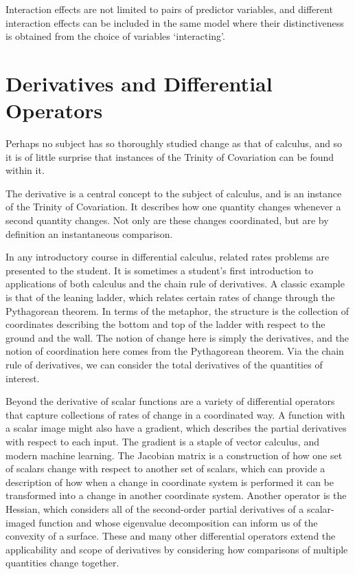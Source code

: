 \documentclass[
  letterpaper,
  DIV=11,
  numbers=noendperiod]{scrreprt}
\begin{document}
Interaction effects are not limited to pairs of predictor variables, and
different interaction effects can be included in the same model where
their distinctiveness is obtained from the choice of variables
`interacting'.

\section{Derivatives and Differential
Operators}\label{derivatives-and-differential-operators}

Perhaps no subject has so thoroughly studied change as that of calculus,
and so it is of little surprise that instances of the Trinity of
Covariation can be found within it.

The derivative is a central concept to the subject of calculus, and is
an instance of the Trinity of Covariation. It describes how one quantity
changes whenever a second quantity changes. Not only are these changes
coordinated, but are by definition an instantaneous comparison.

In any introductory course in differential calculus, related rates
problems are presented to the student. It is sometimes a student's first
introduction to applications of both calculus and the chain rule of
derivatives. A classic example is that of the leaning ladder, which
relates certain rates of change through the Pythagorean theorem. In
terms of the metaphor, the structure is the collection of coordinates
describing the bottom and top of the ladder with respect to the ground
and the wall. The notion of change here is simply the derivatives, and
the notion of coordination here comes from the Pythagorean theorem. Via
the chain rule of derivatives, we can consider the total derivatives of
the quantities of interest.

Beyond the derivative of scalar functions are a variety of differential
operators that capture collections of rates of change in a coordinated
way. A function with a scalar image might also have a gradient, which
describes the partial derivatives with respect to each input. The
gradient is a staple of vector calculus, and modern machine learning.
The Jacobian matrix is a construction of how one set of scalars change
with respect to another set of scalars, which can provide a description
of how when a change in coordinate system is performed it can be
transformed into a change in another coordinate system. Another operator
is the Hessian, which considers all of the second-order partial
derivatives of a scalar-imaged function and whose eigenvalue
decomposition can inform us of the convexity of a surface. These and
many other differential operators extend the applicability and scope of
derivatives by considering how comparisons of multiple quantities change
together.
\end{document}
